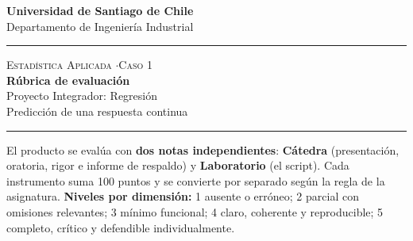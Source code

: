 \documentclass[11pt,letterpaper]{article}
\newcommand{\hrulethin}{\noindent\rule{\textwidth}{0.6pt}}
\begin{document}
\pagestyle{plain}
\begin{center}
    \textbf{\large Universidad de Santiago de Chile}\\[0.1cm]
    Departamento de Ingeniería Industrial
\end{center}
\vspace{0.15cm}\hrulethin\vspace{0.35cm}
\begin{center}
    {\scshape Estadística Aplicada \quad$\cdot$\quad Caso 1}\\[0.35cm]
    {\LARGE \textbf{Rúbrica de evaluación}}\\[0.15cm]
    {\large Proyecto Integrador: Regresión}\\[0.2cm]
    Predicción de una respuesta continua
\end{center}
\vspace{0.2cm}\hrulethin\vspace{0.4cm}
El producto se evalúa con \textbf{dos notas independientes}: \textbf{Cátedra} (presentación, oratoria, rigor e informe de respaldo) y \textbf{Laboratorio} (el script). Cada instrumento suma 100 puntos y se convierte por separado según la regla de la asignatura. \textbf{Niveles por dimensión:} 1 ausente o erróneo; 2 parcial con omisiones relevantes; 3 mínimo funcional;
4 claro, coherente y reproducible; 5 completo, crítico y defendible individualmente.
\end{document}
